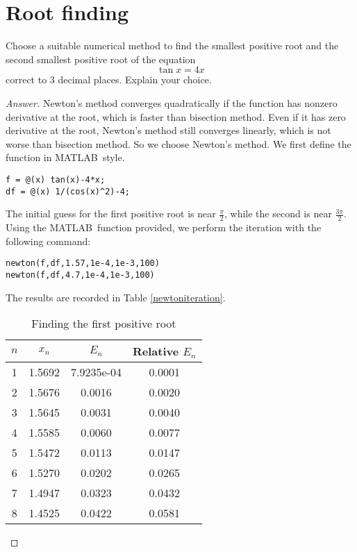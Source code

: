 \section{Root finding}
Choose a suitable numerical method to find the smallest positive root and the second smallest positive root of the equation
\[ \tan x = 4x \]
correct to 3 decimal places.
Explain your choice.
\begin{proof}[Answer]
Newton's method converges quadratically if the function has nonzero derivative at the root, which is faster than bisection method.
Even if it has zero derivative at the root, Newton's method still converges linearly, which is not worse than bisection method.
So we choose Newton's method.
We first define the function in MATLAB\texttrademark\ style.
\begin{lstlisting}[style=Matlab-editor]
f = @(x) tan(x)-4*x;
df = @(x) 1/(cos(x)^2)-4;
\end{lstlisting}
The initial guess for the first positive root is near \(\frac{\pi}{2}\), while the second is near \(\frac{3\pi}{2}\).
Using the MATLAB\texttrademark\ function provided, we perform the iteration with the following command:
\begin{lstlisting}[style=Matlab-editor]
newton(f,df,1.57,1e-4,1e-3,100)
newton(f,df,4.7,1e-4,1e-3,100)
\end{lstlisting}
The results are recorded in Table \ref{newtoniteration}.
\ifnum{}
	\begin{table}[H]
	\centering
	\begin{subtable}[t]{.8\textwidth}
\else
	\begin{table}[htbp]
	\begin{subtable}[t]{.48\linewidth}
\fi
		\centering
		\caption{Finding the first positive root}
		\begin{tabular}[t]{|c|c|c|c|}
		\hline
		$n$ & \(x_n\) & \(E_n\) & Relative \(E_n\) \\	\hline
		1	&	1.5692	&	7.9235e-04	&	0.0001\\	\hline
		2	&	1.5676	&	0.0016	&	0.0020	\\	\hline
		3	&	1.5645	&	0.0031	&	0.0040	\\	\hline
		4	&	1.5585	&	0.0060	&	0.0077	\\	\hline
		5	&	1.5472	&	0.0113	&	0.0147	\\	\hline
		6	&	1.5270	&	0.0202	&	0.0265	\\	\hline
		7	&	1.4947	&	0.0323	&	0.0432	\\	\hline
		8	&	1.4525	&	0.0422	&	0.0581	\\	\hline

\end{tabular}
\end{subtable}
\end{table}
\end{subtable}
\end{table}
\end{proof}
